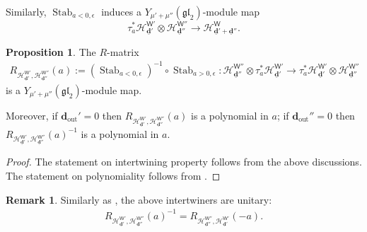 \documentclass[10pt]{amsart}
\theoremstyle{definition}
\newtheorem{Proposition}[Theorem]{Proposition}
\newtheorem{Remark}[Theorem]{Remark}
\numberwithin{equation}{section}
\newcommand{\bd}{\mathbf{d}}
\newcommand{\sW}{\mathsf{W}}
\newcommand{\Stab}{\operatorname{Stab}}
\newcommand{\Out}{\operatorname{out}}
\begin{document}
Similarly, $\Stab_{a<0,\epsilon}$ induces a $Y_{\mu'+\mu''}(\mathfrak{gl}_2)$-module map
$$\tau_{a}^*\mathcal H^{\sW'}_{\underline{\bd}'}\otimes \mathcal H^{\sW''}_{\underline{\bd}''}\to \mathcal H^{\sW}_{\underline{\bd}'+\underline{\bd}''}. $$

\begin{Proposition}
The $R$-matrix
\begin{align*}
    R_{\scriptscriptstyle\mathcal H^{\sW'}_{\underline{\bd}'},\mathcal H^{\sW''}_{\underline{\bd}''}}(a):= \left(\Stab_{a<0,\epsilon}\right)^{-1}\circ \Stab_{a>0,\epsilon}\colon \mathcal H^{\sW''}_{\underline{\bd}''}\otimes\tau_{a}^*\mathcal H^{\sW'}_{\underline{\bd}'}\longrightarrow\tau_{a}^*\mathcal H^{\sW'}_{\underline{\bd}'}\otimes \mathcal H^{\sW''}_{\underline{\bd}''}
\end{align*}
is a $Y_{\mu'+\mu''}(\mathfrak{gl}_2)$-module map. 

Moreover, if $\bd_{\Out}'=0$ then $R_{\scriptscriptstyle\mathcal H^{\sW'}_{\underline{\bd}'},\mathcal H^{\sW''}_{\underline{\bd}''}}(a)$ is a polynomial in $a$; if $\bd_{\Out}''=0$ then $R_{\scriptscriptstyle\mathcal H^{\sW'}_{\underline{\bd}'},\mathcal H^{\sW''}_{\underline{\bd}''}}(a)^{-1}$ is a polynomial in $a$.
\end{Proposition}

\begin{proof}
The statement on intertwining property follows from the above discussions. The statement on polynomiality follows from 
\cite[Prop.~3.35]{COZZ}.
\end{proof}

\begin{Remark}
Similarly as \cite[Prop.~4.5.1]{MO}, the above intertwiners are unitary:
\begin{align*}
    R_{\scriptscriptstyle\mathcal H^{\sW'}_{\underline{\bd}'},\mathcal H^{\sW''}_{\underline{\bd}''}}(a)^{-1}=R_{\scriptscriptstyle\mathcal H^{\sW''}_{\underline{\bd}''},\mathcal H^{\sW'}_{\underline{\bd}'}}(-a).
\end{align*}
\end{Remark}

\end{document}
